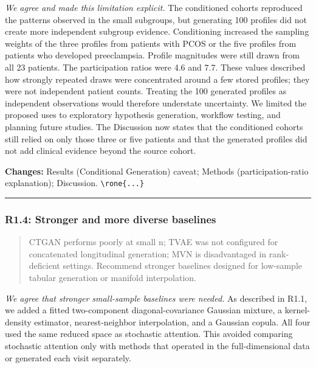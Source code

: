 \documentclass[
  11pt,
  letterpaper,
]{article}
\begin{document}
\emph{We agree and made this limitation explicit.} The conditioned cohorts reproduced the patterns observed in the small subgroups, but generating 100 profiles did not create more independent subgroup evidence. Conditioning increased the sampling weights of the three profiles from patients with PCOS or the five profiles from patients who developed preeclampsia. Profile magnitudes were still drawn from all 23 patients. The participation ratios were 4.6 and 7.7. These values described how strongly repeated draws were concentrated around a few stored profiles; they were not independent patient counts. Treating the 100 generated profiles as independent observations would therefore understate uncertainty. We limited the proposed uses to exploratory hypothesis generation, workflow testing, and planning future studies. The Discussion now states that the conditioned cohorts still relied on only those three or five patients and that the generated profiles did not add clinical evidence beyond the source cohort.

\textbf{Changes:} Results (Conditional Generation) caveat; Methods (participation-ratio explanation); Discussion. \texttt{\textbackslash{}rone\{...\}}

\begin{center}\rule{0.5\linewidth}{0.5pt}\end{center}

\subsubsection{R1.4: Stronger and more diverse baselines}\label{r14-stronger-and-more-diverse-baselines}

\begin{quote}
CTGAN performs poorly at small n; TVAE was not configured for concatenated longitudinal generation; MVN is disadvantaged in rank-deficient settings. Recommend stronger baselines designed for low-sample tabular generation or manifold interpolation.
\end{quote}

\emph{We agree that stronger small-sample baselines were needed.} As described in R1.1, we added a fitted two-component diagonal-covariance Gaussian mixture, a kernel-density estimator, nearest-neighbor interpolation, and a Gaussian copula. All four used the same reduced space as stochastic attention. This avoided comparing stochastic attention only with methods that operated in the full-dimensional data or generated each visit separately.
\end{document}

